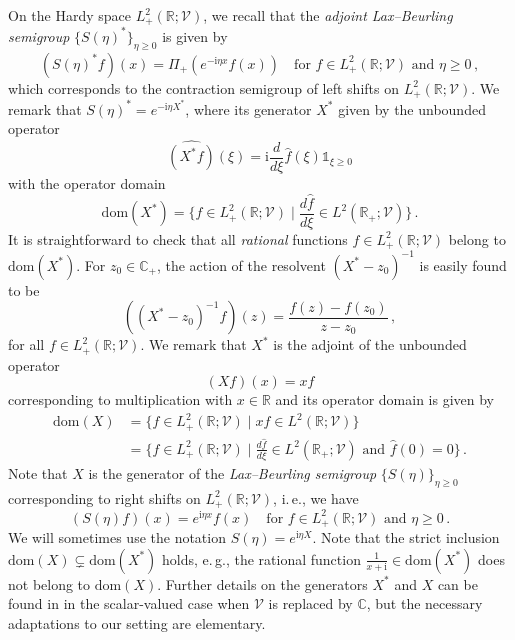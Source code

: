 \documentclass[11pt,reqno]{amsart}
\theoremstyle{definition}
\theoremstyle{remark}
\theoremstyle{remark}
\numberwithin{equation}{section}
\newcommand{\C}{\mathbb{C}}
\newcommand{\R}{\mathbb{R}}
\newcommand{\VV}{\mathcal{V}}
\newcommand{\dom}{\mathrm{dom}}
\newcommand{\ii}{\mathrm{i}}
\begin{document}
On the Hardy space $L^2_+(\R; \VV)$, we recall that the {\em adjoint Lax--Beurling semigroup} $\{ S(\eta)^* \}_{\eta \geq 0}$ is given by
$$
(S(\eta)^* f)(x) = \Pi_+( e^{-\ii \eta x} f(x)) \quad \mbox{for $f \in L^2_+(\R; \VV)$ and $\eta \geq 0$} \, ,
$$
which corresponds to the contraction semigroup of left shifts on $L^2_+(\R; \VV)$. We remark that $S(\eta)^* = e^{-\ii \eta X^*}$, where its generator $X^*$ given by the unbounded operator 
$$
\widehat{(X^* f)}(\xi) = \ii \frac{d}{d \xi} \widehat{f}(\xi) \mathds{1}_{\xi \geq 0} 
$$
with the operator domain
$$
\dom(X^*) = \big \{ f \in L^2_+(\R; \VV) \mid \frac{d \widehat{f}}{d\xi} \in L^2(\R_+; \VV) \big \} \, . 
$$
It is straightforward to check that all {\em rational} functions $f\in L^2_+(\R; \VV)$ belong to $\dom(X^*)$. For $z_0 \in \C_+$, the action of the resolvent $(X^*-z_0)^{-1}$ is easily found to be
$$
((X^*-z_0)^{-1} f)(z) = \frac{f(z)-f(z_0)}{z-z_0} \, ,
$$
for all $f \in L^2_+(\R; \VV)$. We remark that $X^*$ is the adjoint of the unbounded operator 
$$
(X f)(x)= x f
$$
corresponding to multiplication with $x \in \R$ and its operator domain is given by
\begin{align*}
\dom(X) & =  \big \{  f \in L^2_+(\R; \VV) \mid x f \in L^2(\R; \VV) \big \} \\
& = \big \{  f \in L^2_+(\R; \VV) \mid \mbox{$\frac{d \widehat{f}}{d\xi} \in L^2(\R_+; \VV)$ and $\widehat{f}(0) = 0$} \big \} \, . 
\end{align*}
Note that $X$ is the generator of the {\em Lax--Beurling semigroup} $\{ S(\eta) \}_{\eta \geq 0}$ corresponding to right shifts on $L^2_+(\R; \VV)$, i.\,e., we have
$$
(S(\eta) f)(x) = e^{\ii \eta x} f(x) \quad \mbox{for $f \in L^2_+(\R; \VV)$ and $\eta \geq 0$} \, .
$$
We will sometimes use the notation $S(\eta) = e^{\ii \eta X}$. Note that the strict inclusion $\dom(X) \subsetneq \dom(X^*)$ holds, e.\,g., the rational function $\frac{1}{x+\ii} \in \dom(X^*)$ does not belong to $\dom(X)$. Further details on the generators $X^*$ and $X$ can be found in \cite{GePu-24} in the scalar-valued case when $\VV$ is replaced by $\C$, but  the necessary adaptations to our setting are elementary.
\end{document}
